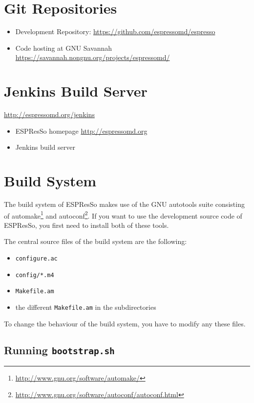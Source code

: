 \documentclass[
a4paper,                        %
11pt,                           %
twoside,                        %
footsepline,                    %
headsepline,                    %
headexclude,                    %
footexclude,                    %
pagesize,                       %
bibtotocnumbered,               %
idxtotoc                        %
]{scrreprt}
\newcommand{\es}{\mbox{\textsf{ESPResSo}}\xspace}
\begin{document}
\section{Git Repositories}
\label{sec:git}

\begin{itemize}
\item Development Repository: \url{https://github.com/espressomd/espresso}
\item 

Code hosting at GNU Savannah
  \url{https://savannah.nongnu.org/projects/espressomd/}

\end{itemize}
\section{Jenkins Build Server}
\label{sec:jenkins}

\url{http://espressomd.org/jenkins}
\begin{itemize}
\item \es homepage \url{http://espressomd.org}
\item Jenkins build server 
\end{itemize}

\section{Build System}
\label{sec:build_system}

The build system of \es makes use of the GNU autotools suite
consisting of
automake\footnote{\url{http://www.gnu.org/software/automake/}} and
autoconf\footnote{\url{http://www.gnu.org/software/autoconf/autoconf.html}}.
If you want to use the development source code of ESPResSo, you first
need to install both of these tools.

The central source files of the build system are the following:
\begin{itemize}
\item \texttt{configure.ac}
\item \texttt{config/*.m4}
\item \texttt{Makefile.am}
\item the different \texttt{Makefile.am} in the subdirectories
\end{itemize}

To change the behaviour of the build system, you have to modify any
these files.

\subsection{Running \texttt{bootstrap.sh}}
\end{document}
